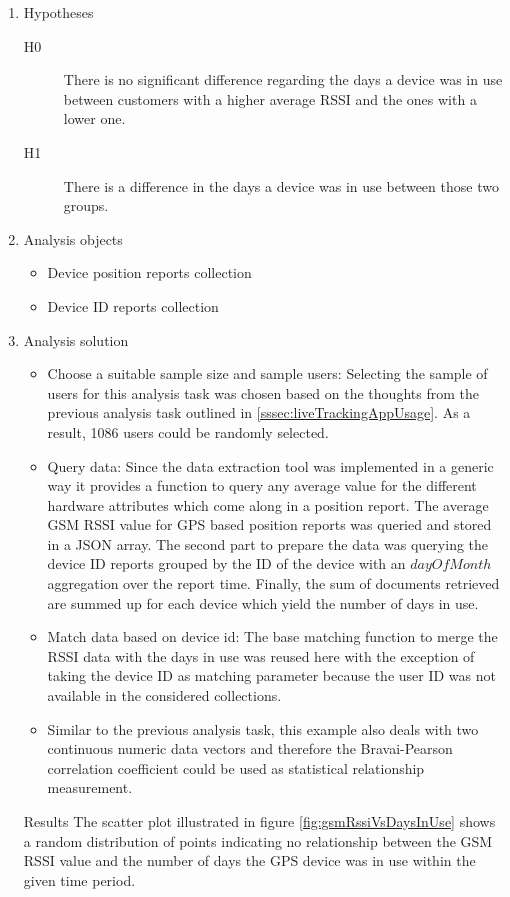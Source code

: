 \begin{enumerate}
	\item Hypotheses
	\begin{description}
		\item[H0] There is no significant difference regarding the days a device was in use between customers with a higher average RSSI and the ones with a lower one.
		\item [H1] There is a difference in the days a device was in use between those two groups. 
	\end{description}
	\item Analysis objects
	\begin{itemize}
		\item Device position reports collection
		\item Device ID reports collection
	\end{itemize}
	\item Analysis solution
	\begin{itemize}
		\item Choose a suitable sample size and sample users: Selecting the sample of users for this analysis task was chosen based on the thoughts from the previous analysis task outlined in \ref{sssec:liveTrackingAppUsage}. As a result, 1086 users could be randomly selected.
		\item Query data: Since the data extraction tool was implemented in a generic way it provides a function to query any average value for the different hardware attributes which come along in a position report. The average GSM RSSI value for GPS based position reports was queried and stored in a JSON array. The second part to prepare the data was querying the device ID reports grouped by the ID of the device with an $dayOfMonth$ aggregation over the report time. Finally, the sum of documents retrieved are summed up for each device which yield the number of days in use.  
		\item Match data based on device id: The base matching function to merge the RSSI data with the days in use was reused here with the exception of taking the device ID as matching parameter because the user ID was not available in the considered collections. 
		\item Similar to the previous analysis task, this example also deals with two continuous numeric data vectors and therefore the Bravai-Pearson correlation coefficient could be used as statistical relationship measurement. 
	\end{itemize}
	\item [Results] 
	The scatter plot illustrated in figure \ref{fig:gsmRssiVsDaysInUse} shows a random distribution of points indicating no relationship between the GSM RSSI value and the number of days the GPS device was in use within the given time period. 
	

\end{enumerate}
